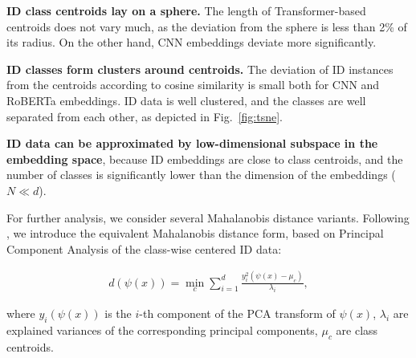 \documentclass[letterpaper, final]{article} %
\begin{document}
{\bf ID class centroids lay on a sphere.} The length of Transformer-based centroids  does not vary much, as the deviation from the sphere is less than 2\% of its radius. On the other hand, CNN embeddings deviate more significantly.

{\bf ID classes form clusters around centroids.} The deviation of ID instances from the centroids according to cosine similarity is small both for CNN and RoBERTa embeddings. ID data is well clustered, and the classes are well separated from each other, as depicted in Fig.~\ref{fig:tsne}.


{\bf ID data can be approximated by low-dimensional subspace in the embedding space}, because ID embeddings are close to class centroids, and the number of classes is significantly lower than the dimension of the embeddings ($N \ll d$). 

For further analysis, we consider several Mahalanobis distance variants. Following \citet*{Kamoi2020WhyIT}, we introduce the equivalent Mahalanobis distance form, based on  Principal Component Analysis of the class-wise centered ID data:


\begin{equation}
\begin{gathered}
d(\psi(x))=\min\limits_{c}\sum\limits_{i=1}^{d}\frac{y_i^2(\psi(x) - \mu_c)}{\lambda_i},
\end{gathered}
\label{eq:Maha_via_PCA}
\end{equation}

where $y_i(\psi(x))$ is the $i$-th component of the PCA transform of $\psi(x)$, $\lambda_i$ are explained variances of the corresponding principal components, $\mu_c$ are class centroids.
\end{document}
